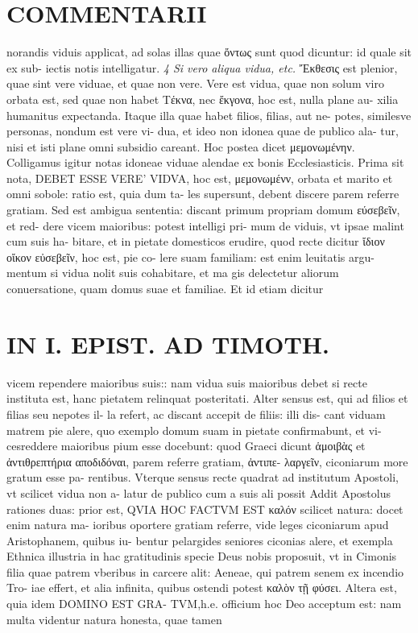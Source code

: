 \documentclass{article}
\begin{document}
\begin{pages}
\section*{COMMENTARII }
\marginpar{[ p.122 ]}\pstart norandis viduis applicat, ad solas illas quae ὄντως sunt quod dicuntur: id quale sit ex sub- iectis notis intelligatur.  \pend
\textit{4 Si vero aliqua vidua, etc. }\pstart Ἔκθεσις est plenior, quae sint vere viduae, et quae non vere. Vere est vidua, quae non solum viro orbata est, sed quae non habet Τέκνα, nec ἔκγονα, hoc est, nulla plane au- xilia humanitus expectanda.  \pend\pstart Itaque illa quae habet filios, filias, aut ne- potes, similesve personas, nondum est vere vi- dua, et ideo non idonea quae de publico ala- tur, nisi et isti plane omni subsidio careant. Hoc postea dicet μεμονωμένην. Colligamus igitur notas idoneae viduae alendae ex bonis Ecclesiasticis. Prima sit nota, DEBET ESSE VERE' VIDVA, hoc est, μεμονωμένν, orbata et marito et omni sobole: ratio est, quia dum ta- les supersunt, debent discere parem referre gratiam. Sed est ambigua sententia: discant primum propriam domum εύσεβεῖν, et red- dere vicem maioribus: potest intelligi pri- mum de viduis, vt ipsae malint cum suis ha- bitare, et in pietate domesticos erudire, quod recte dicitur ἴδιον οἴκον εὐσεβεῖν, hoc est, pie co- lere suam familiam: est enim leuitatis argu- mentum si vidua nolit suis cohabitare, et ma gis delectetur aliorum conuersatione, quam domus suae et familiae. Et id etiam dicitur  \pend
\section*{IN I. EPIST. AD TIMOTH. }
\marginpar{[ p.123 ]}\pstart vicem rependere maioribus suis:: nam vidua suis maioribus debet si recte instituta est, hanc pietatem relinquat posteritati. Alter sensus est, qui ad filios et filias seu nepotes il- la refert, ac discant accepit de filiis: illi dis- cant viduam matrem pie alere, quo exemplo domum suam in pietate confirmabunt, et vi- cesreddere maioribus pium esse docebunt: quod Graeci dicunt ἁμοιβὰς et ἀντιθρεπτήρια αποδιδόναι, parem referre gratiam, ἀντιπε- λαργεῖν, ciconiarum more gratum esse pa- rentibus. Vterque sensus recte quadrat ad institutum Apostoli, vt scilicet vidua non a- latur de publico cum a suis ali possit  \pend\pstart Addit Apostolus rationes duas: prior est, QVIA HOC FACTVM EST καλόν scilicet natura: docet enim natura ma- ioribus oportere gratiam referre, vide leges ciconiarum apud Aristophanem, quibus iu- bentur pelargides seniores ciconias alere, et exempla Ethnica illustria in hac gratitudinis specie Deus nobis proposuit, vt in Cimonis filia quae patrem vberibus in carcere alit: Aeneae, qui patrem senem ex incendio Tro- iae effert, et alia infinita, quibus ostendi potest καλὸν τῇ φύσει.  \pend\pstart Altera est, quia idem DOMINO EST GRA- TVM,h.e. officium hoc Deo acceptum est: nam multa videntur natura honesta, quae tamen  \pend

\end{pages}
\end{document}
